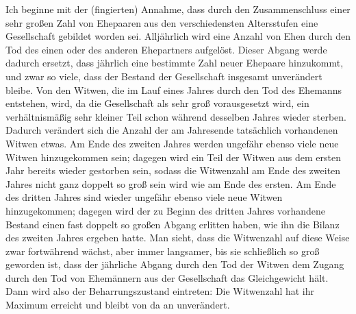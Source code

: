 \noindent\hspace*{\parindent}Ich beginne mit der (fingierten) Annahme, dass durch den Zusammenschluss einer sehr großen Zahl von Ehepaaren aus den verschiedensten Altersstufen eine Gesellschaft gebildet worden sei. Alljährlich wird eine Anzahl von Ehen durch den Tod des einen oder des anderen Ehepartners aufgelöst. Dieser Abgang werde dadurch ersetzt, dass jährlich eine bestimmte Zahl neuer Ehepaare hinzukommt, und zwar so viele, dass der Bestand der Gesellschaft insgesamt unverändert bleibe. Von den Witwen, die im Lauf eines Jahres durch den Tod des Ehemanns entstehen, wird, da die Gesellschaft als sehr groß vorausgesetzt wird, ein verhältnismäßig sehr kleiner Teil schon während desselben Jahres wieder sterben. Dadurch verändert sich die Anzahl der am Jahresende tatsächlich vorhandenen Witwen etwas. Am Ende des zweiten Jahres werden ungefähr ebenso viele neue Witwen hinzugekommen sein; dagegen wird ein Teil der Witwen aus dem ersten Jahr bereits wieder gestorben sein, sodass die Witwenzahl am Ende des zweiten Jahres nicht ganz doppelt so groß sein wird wie am Ende des ersten. Am Ende des dritten Jahres sind wieder ungefähr ebenso viele neue Witwen hinzugekommen; dagegen wird der zu Beginn des dritten Jahres vorhandene Bestand einen fast doppelt so großen Abgang erlitten haben, wie ihn die Bilanz des zweiten Jahres ergeben hatte. Man sieht, dass die Witwenzahl auf diese Weise zwar fortwährend wächst, aber immer langsamer, bis sie schließlich so groß geworden ist, dass der jährliche Abgang durch den Tod der Witwen dem Zugang durch den Tod von Ehemännern aus der Gesellschaft das Gleichgewicht hält. Dann wird also der Beharrungszustand eintreten: Die Witwenzahl hat ihr Maximum erreicht und bleibt von da an unverändert.

